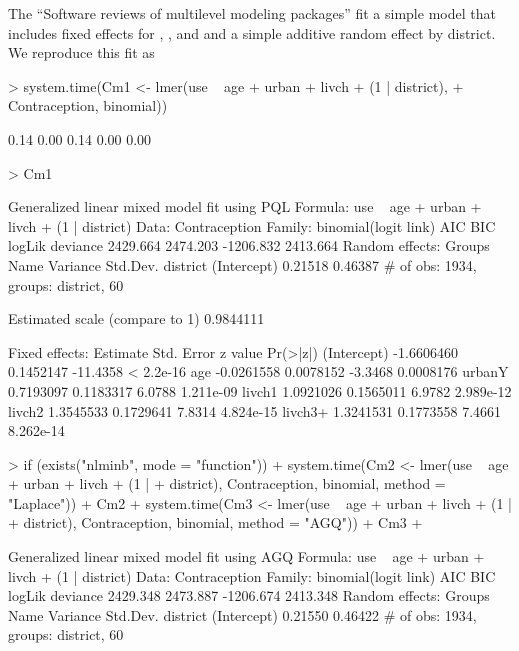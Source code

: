 \documentclass[12pt]{article}
\begin{document}
The ``Software reviews of multilevel modeling packages'' fit a simple
model that includes fixed effects for , , and
 and a simple additive random effect by district.  We
reproduce this fit as
\begin{Schunk}
\begin{Sinput}
> system.time(Cm1 <- lmer(use ~ age + urban + livch + (1 | district), 
+     Contraception, binomial))
\end{Sinput}
\begin{Soutput}
[1] 0.14 0.00 0.14 0.00 0.00
\end{Soutput}
\begin{Sinput}
> Cm1
\end{Sinput}
\begin{Soutput}
Generalized linear mixed model fit using PQL 
Formula: use ~ age + urban + livch + (1 | district) 
   Data: Contraception 
 Family: binomial(logit link)
      AIC      BIC    logLik deviance
 2429.664 2474.203 -1206.832 2413.664
Random effects:
     Groups        Name    Variance    Std.Dev. 
   district (Intercept)     0.21518     0.46387 
# of obs: 1934, groups: district, 60

Estimated scale (compare to 1)  0.9844111 

Fixed effects:
              Estimate Std. Error  z value  Pr(>|z|)
(Intercept) -1.6606460  0.1452147 -11.4358 < 2.2e-16
age         -0.0261558  0.0078152  -3.3468 0.0008176
urbanY       0.7193097  0.1183317   6.0788 1.211e-09
livch1       1.0921026  0.1565011   6.9782 2.989e-12
livch2       1.3545533  0.1729641   7.8314 4.824e-15
livch3+      1.3241531  0.1773558   7.4661 8.262e-14
\end{Soutput}
\begin{Sinput}
> if (exists("nlminb", mode = "function")) {
+     system.time(Cm2 <- lmer(use ~ age + urban + livch + (1 | 
+         district), Contraception, binomial, method = "Laplace"))
+     Cm2
+     system.time(Cm3 <- lmer(use ~ age + urban + livch + (1 | 
+         district), Contraception, binomial, method = "AGQ"))
+     Cm3
+ }
\end{Sinput}
\begin{Soutput}
Generalized linear mixed model fit using AGQ 
Formula: use ~ age + urban + livch + (1 | district) 
   Data: Contraception 
 Family: binomial(logit link)
      AIC      BIC    logLik deviance
 2429.348 2473.887 -1206.674 2413.348
Random effects:
     Groups        Name    Variance    Std.Dev. 
   district (Intercept)     0.21550     0.46422 
# of obs: 1934, groups: district, 60


\end{Soutput}
\end{Schunk}
\end{document}
